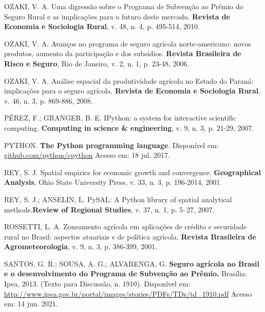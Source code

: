 \documentclass[
	12pt,				%
	openright,			%
	oneside,			%
	a4paper,			%
	chapter=TITLE,		%
	section=TITLE,		%
	english,			%
	french,				%
	spanish,			%
	brazil				%
	]{abntex2}
\begin{document}
\begin{thebibliography}{}
    {OZAKI, V. A. Uma digressão sobre o Programa de Subvenção ao Prêmio do Seguro Rural e as implicações para o futuro deste mercado. \textbf{Revista de Economia e Sociologia Rural}, v. 48, n. 4, p. 495-514, 2010.}
    
    {OZAKI, V. A. Avanços no programa de seguro agrícola norte-americano: novos produtos, aumento da participação e dos subsídios. \textbf{Revista Brasileira de Risco e Seguro}, Rio de Janeiro, v. 2, n. 1, p. 23-48, 2006.}
    
    {OZAKI, V. A. Análise espacial da produtividade agrícola no Estado do Paraná: implicações para o seguro agrícola. \textbf{Revista de Economia e Sociologia Rural}, v. 46, n. 3, p. 869-886, 2008.}
    
    {PÉREZ, F.; GRANGER, B. E. IPython: a system for interactive scientific computing. \textbf{Computing in science \& engineering}, v. 9, n. 3, p. 21-29, 2007.}
    
    {PYTHON. \textbf{The Python programming language}. Disponível em: \url{github.com/python/cpython}  Acesso em: 18 jul. 2017.}
    
    {REY, S. J. Spatial empirics for economic growth and convergence. \textbf{Geographical Analysis}, Ohio State University Press, v. 33, n. 3, p. 196-2014, 2001.}
    
    {REY, S. J.; ANSELIN, L. PySAL: A Python library of spatial analytical methods.\textbf{Review of Regional Studies}, v. 37, n. 1, p. 5–27, 2007.}
    
    {ROSSETTI, L. A. Zoneamento agrícola em aplicações de crédito e securidade rural no Brasil: aspectos atuariais e de política agrícola. \textbf{Revista Brasileira de Agrometeorologia}, v. 9, n. 3, p. 386-399, 2001.}
    
    {SANTOS, G. R.; SOUSA, A. G.; ALVARENGA, G. \textbf{Seguro agrícola no Brasil e o desenvolvimento do Programa de Subvenção ao Prêmio.} Brasília: Ipea, 2013. (Texto para Discussão, n. 1910). Disponível em: \url{http://www.ipea.gov.br/portal/images/stories/PDFs/TDs/td_1910.pdf}  Acesso em: 14 jun. 2021.}
    

\end{thebibliography}
\end{document}
